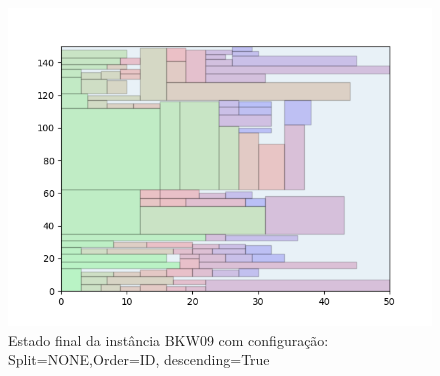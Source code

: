 \begin{figure}[H]
    \centering
    \caption[]{Estado final da instância BKW09 com configuração: Split=NONE,Order=ID, descending=True}
    \label{fig:bkw09-none-id-true}
    \includegraphics[scale=0.5]{output/figures/bkw/bkw09/none/id/true/000}
\end{figure}